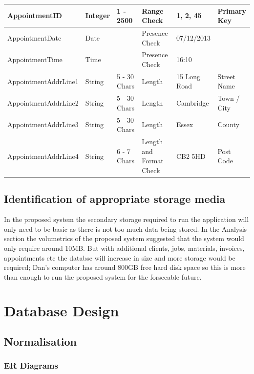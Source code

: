 \begin{flushleft}
\begin{longtable}{|p{3.6cm}|p{1.5cm}|p{2cm}|p{2cm}|p{2cm}|p{2cm}|}
AppointmentID & Integer & 1 - 2500 & Range Check & 1, 2, 45 & Primary Key \\ \hline
AppointmentDate & Date & & Presence Check  & 07/12/2013  & \\ \hline
AppointmentTime & Time &  & Presence Check  & 16:10 & \\ \hline
AppointmentAddrLine1 & String & 5 - 30 Chars & Length & 15 Long Road & Street Name \\ \hline
AppointmentAddrLine2 & String & 5 - 30 Chars & Length & Cambridge & Town / City \\ \hline
AppointmentAddrLine3 & String & 5 - 30 Chars & Length & Essex & County \\ \hline
AppointmentAddrLine4 & String & 6 - 7 Chars & Length and Format Check & CB2 5HD & Post Code \\ \hline

\end{longtable}
\end{flushleft}

\subsection{Identification of appropriate storage media}

\begin{flushleft}
In the proposed system the secondary storage required to run the application will only need to be basic as there is not too much data being stored. In the Analysis section the volumetrics of the proposed system suggested that the system would only require around 10MB. But with additional clients, jobs, materials, invoices, appointments etc the databse will increase in size and more storage would be required; Dan's computer has around 800GB free hard disk space so this is more than enough to run the proposed system for the forseeable future.
\end{flushleft}

\pagebreak
\section{Database Design}

\subsection{Normalisation}

\subsubsection{ER Diagrams}

